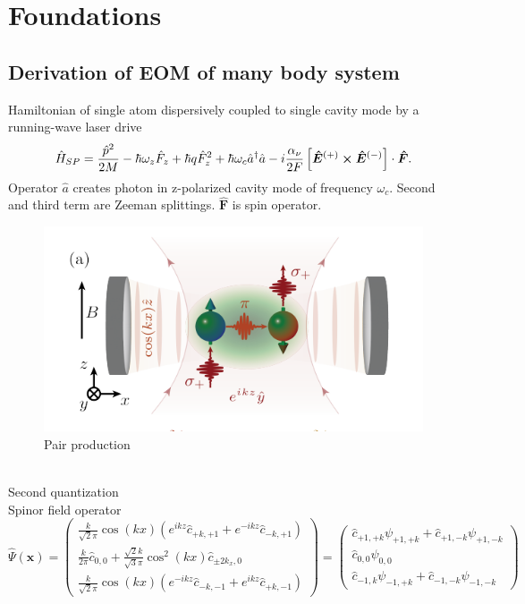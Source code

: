 \section{Foundations}\label{sec:foundation}
\subsection{Derivation of EOM of many body system}\label{sec:fou_derivation_of_EOM}
Hamiltonian of single atom dispersively coupled to single cavity mode by a running-wave laser drive 
\begin{equation}
	\hat{H}_{SP} = \frac{\hat{p}^2}{2M}- \hbar \omega_z \hat{F}_z + \hbar q \hat{F}^2_z + \hbar \omega_c \hat{a}^\dag \hat{a}-i \frac{\alpha_\nu}{2F}\left [ \bm{\hat{E}}^{(+)} \cross \bm{\hat{E}}^{(-)} \right ] \cdot \bm{\hat{F}} .
\end{equation}
Operator $\hat{a}$ creates photon in z-polarized cavity mode of frequency $\omega_c$. Second and third term are Zeeman splittings. $\bm{\hat{F}}$ is spin operator.
\begin{figure}[h!]
	\centering
	\includegraphics[width=1\linewidth]{Images/scetch_pair_production.png}
	\caption{Pair production}
	\label{fig:scetch_pair_production} %
\end{figure}
\\ \break
Second quantization 
\\ \break
Spinor field operator 
\begin{equation}
	\hat{\Psi} (\bm{x}) = \left (
	\begin{matrix}
		\frac{k}{\sqrt{2}\pi} \cos(kx) ( e^{ikz}\hat{c}_{+k,+1} + e^{-ikz} \hat{c}_{-k,+1})
		\\
		\frac{k}{2 \pi}\hat{c}_{0,0} + \frac{\sqrt{2}k}{\sqrt{3}\pi} \cos^2(kx)\hat{c}_{\pm2k_x,0}
		\\
		\frac{k}{\sqrt{2}\pi} \cos(kx) ( e^{-ikz}\hat{c}_{-k,-1} + e^{ikz} \hat{c}_{+k,-1})
	\end{matrix} \right)
	= \left (
	\begin{matrix}
		\hat{c}_{+1,+k} \psi_{+1,+k} + \hat{c}_{+1,-k} \psi_{+1,-k}
		\\
		\hat{c}_{0,0}\psi_{0,0} 
		\\
		\hat{c}_{-1,k} \psi_{-1,+k} + \hat{c}_{-1,-k}\psi_{-1,-k}
	\end{matrix}
	\right)
\end{equation}
